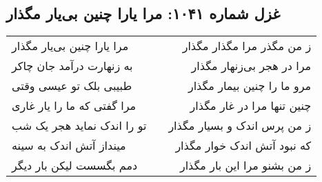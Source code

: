 \begin{center}
\section*{غزل شماره ۱۰۴۱: مرا یارا چنین بی‌یار مگذار}
\label{sec:1041}
\begin{longtable}{l p{0.5cm} r}
مرا یارا چنین بی‌یار مگذار
&&
ز من مگذر مرا مگذار مگذار
\\
به زنهارت درآمد جان چاکر
&&
مرا در هجر بی‌زنهار مگذار
\\
طبیبی بلک تو عیسی وقتی
&&
مرو ما را چنین بیمار مگذار
\\
مرا گفتی که ما را یار غاری
&&
چنین تنها مرا در غار مگذار
\\
تو را اندک نماید هجر یک شب
&&
ز من پرس اندک و بسیار مگذار
\\
مینداز آتش اندک به سینه
&&
که نبود آتش اندک خوار مگذار
\\
دمم بگسست لیکن بار دیگر
&&
ز من بشنو مرا این بار مگذار
\\
\end{longtable}
\end{center}
